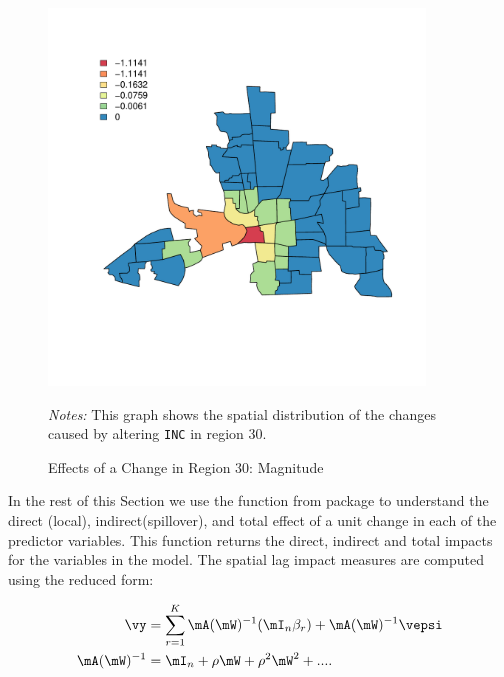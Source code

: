 \begin{figure}[ht]
  \caption{Effects of a Change in Region 30: Magnitude}
    \label{fig:predicted-effect2}
        \centering 
	\begin{minipage}{.9\linewidth}
\begin{knitrout}
\color{fgcolor}

{\centering \includegraphics[width=10cm,height=10cm]{figure/predicted-effect2-1} 

}


\end{knitrout}
\footnotesize
		\emph{Notes:} This graph shows the spatial distribution of the changes caused by altering \texttt{INC} in region 30.
	\end{minipage}
\end{figure}


In the rest of this Section we use the  function from  package to understand the direct (local), indirect(spillover), and total effect of a unit change in each of the predictor variables. This function returns the direct, indirect and total impacts for the variables in the model. The spatial lag impact measures are computed using the reduced form:

\begin{equation}
  \begin{aligned}
    \vy & = \sum_{r = 1}^K \mA(\mW)^{-1}(\mI_n\beta_r) + \mA(\mW)^{-1}\vepsi \\
     \mA(\mW)^{-1} & = \mI_n + \rho\mW + \rho^2\mW^2 +....
  \end{aligned}
\end{equation}

